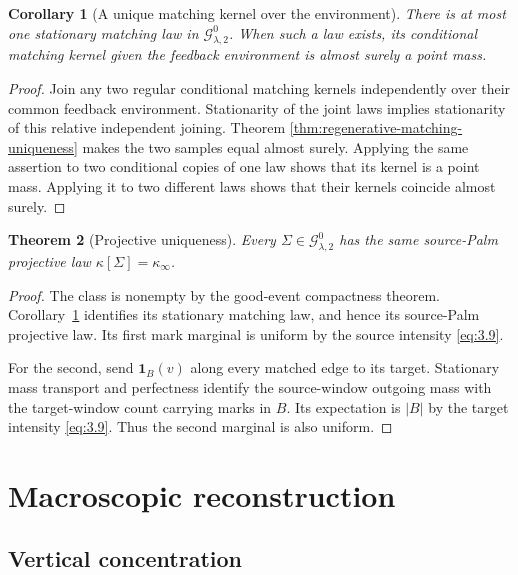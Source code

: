 \documentclass[11pt,reqno]{amsart}
\newtheorem{theorem}{Theorem}[section]
\newtheorem{corollary}[theorem]{Corollary}
\theoremstyle{definition}
\theoremstyle{remark}
\numberwithin{equation}{section}
\begin{document}
\begin{corollary}[A unique matching kernel over the environment]
\label{cor:unique-environment-kernel}
There is at most one stationary matching law in
\(\mathcal G_{\lambda,2}^0\).  When such a law exists, its
conditional matching kernel given the feedback environment is almost
surely a point mass.
\end{corollary}

\begin{proof}
Join any two regular conditional matching kernels independently over
their common feedback environment.  Stationarity of the joint laws
implies stationarity of this relative independent joining.  Theorem
\ref{thm:regenerative-matching-uniqueness} makes the two samples equal
almost surely.  Applying the same assertion to two conditional copies
of one law shows that its kernel is a point mass.  Applying it to two
different laws shows that their kernels coincide almost surely.
\end{proof}

\begin{theorem}[Projective uniqueness]
\label{thm:EFE2}
Every \(\Sigma\in\mathcal G_{\lambda,2}^0\) has the same source-Palm
projective law \(\kappa[\Sigma]=\kappa_\infty\).
\end{theorem}

\begin{proof}
The class is nonempty by the good-event compactness theorem.
Corollary~\ref{cor:unique-environment-kernel} identifies its stationary
matching law, and hence its source-Palm projective law.  Its first
mark marginal is uniform by the source intensity \eqref{eq:3.9}.

For the second, send \(\mathbf1_B(v)\) along every matched edge to its target.
Stationary mass transport and perfectness identify the source-window
outgoing mass with the target-window count carrying marks in \(B\).
Its expectation is \(|B|\) by the target intensity \eqref{eq:3.9}.  Thus the
second marginal is also uniform.
\end{proof}

\section{Macroscopic reconstruction}
\label{sec:reconstruction}

\subsection{Vertical concentration}
\end{document}
